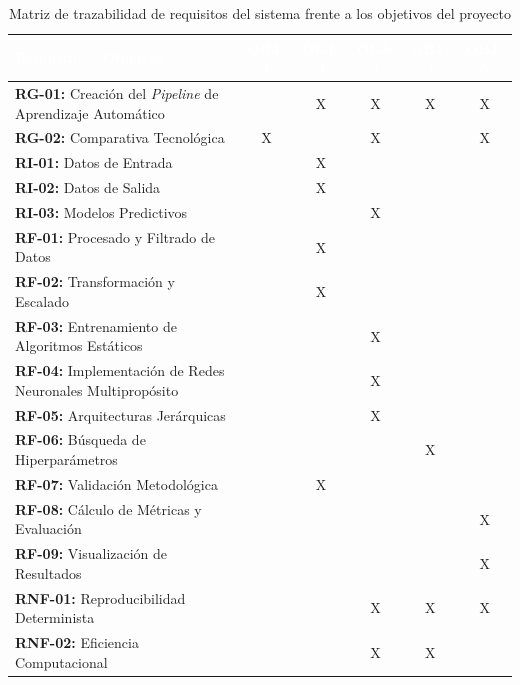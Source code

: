 \begin{table}[htp]
	\centering
	\renewcommand{\arraystretch}{1.3}
	\begin{tabular}{|m{5.5cm}|c|c|c|c|c|}
		\hline
		\rowcolor[HTML]{5B9BD5} 
		\textcolor{white}{\textbf{Requisito \textbackslash\ Objetivo}} & \textcolor{white}{\textbf{OBJ-1}} & \textcolor{white}{\textbf{OBJ-2}} & \textcolor{white}{\textbf{OBJ-3}} & \textcolor{white}{\textbf{OBJ-4}} & \textcolor{white}{\textbf{OBJ-5}} \\
		\hline
		\textbf{RG-01:} Creación del \textit{Pipeline} de Aprendizaje Automático & & X & X & X & X \\
		\hline
		\textbf{RG-02:} Comparativa Tecnológica & X & & X & & X \\
		\hline
		\textbf{RI-01:} Datos de Entrada & & X & & & \\
		\hline
		\textbf{RI-02:} Datos de Salida & & X & & & \\
		\hline
		\textbf{RI-03:} Modelos Predictivos & & & X & & \\
		\hline
		\textbf{RF-01:} Procesado y Filtrado de Datos & & X & & & \\
		\hline
		\textbf{RF-02:} Transformación y Escalado & & X & & & \\
		\hline
		\textbf{RF-03:} Entrenamiento de Algoritmos Estáticos & & & X & & \\
		\hline
		\textbf{RF-04:} Implementación de Redes Neuronales Multipropósito & & & X & & \\
		\hline
		\textbf{RF-05:} Arquitecturas Jerárquicas & & & X & & \\
		\hline
		\textbf{RF-06:} Búsqueda de Hiperparámetros & & & & X & \\
		\hline
		\textbf{RF-07:} Validación Metodológica & & X & & & \\
		\hline
		\textbf{RF-08:} Cálculo de Métricas y Evaluación & & & & & X \\
		\hline
		\textbf{RF-09:} Visualización de Resultados & & & & & X \\
		\hline
		\textbf{RNF-01:} Reproducibilidad Determinista & & & X & X & X \\
		\hline
		\textbf{RNF-02:} Eficiencia Computacional & & & X & X & \\
		\hline
	\end{tabular}
	\caption{Matriz de trazabilidad de requisitos del sistema frente a los objetivos del proyecto}
\end{table}